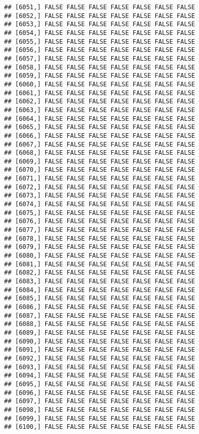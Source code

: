 \documentclass[
]{article}
\begin{document}
\begin{verbatim}
## [6051,] FALSE FALSE FALSE FALSE FALSE FALSE FALSE
## [6052,] FALSE FALSE FALSE FALSE FALSE FALSE FALSE
## [6053,] FALSE FALSE FALSE FALSE FALSE FALSE FALSE
## [6054,] FALSE FALSE FALSE FALSE FALSE FALSE FALSE
## [6055,] FALSE FALSE FALSE FALSE FALSE FALSE FALSE
## [6056,] FALSE FALSE FALSE FALSE FALSE FALSE FALSE
## [6057,] FALSE FALSE FALSE FALSE FALSE FALSE FALSE
## [6058,] FALSE FALSE FALSE FALSE FALSE FALSE FALSE
## [6059,] FALSE FALSE FALSE FALSE FALSE FALSE FALSE
## [6060,] FALSE FALSE FALSE FALSE FALSE FALSE FALSE
## [6061,] FALSE FALSE FALSE FALSE FALSE FALSE FALSE
## [6062,] FALSE FALSE FALSE FALSE FALSE FALSE FALSE
## [6063,] FALSE FALSE FALSE FALSE FALSE FALSE FALSE
## [6064,] FALSE FALSE FALSE FALSE FALSE FALSE FALSE
## [6065,] FALSE FALSE FALSE FALSE FALSE FALSE FALSE
## [6066,] FALSE FALSE FALSE FALSE FALSE FALSE FALSE
## [6067,] FALSE FALSE FALSE FALSE FALSE FALSE FALSE
## [6068,] FALSE FALSE FALSE FALSE FALSE FALSE FALSE
## [6069,] FALSE FALSE FALSE FALSE FALSE FALSE FALSE
## [6070,] FALSE FALSE FALSE FALSE FALSE FALSE FALSE
## [6071,] FALSE FALSE FALSE FALSE FALSE FALSE FALSE
## [6072,] FALSE FALSE FALSE FALSE FALSE FALSE FALSE
## [6073,] FALSE FALSE FALSE FALSE FALSE FALSE FALSE
## [6074,] FALSE FALSE FALSE FALSE FALSE FALSE FALSE
## [6075,] FALSE FALSE FALSE FALSE FALSE FALSE FALSE
## [6076,] FALSE FALSE FALSE FALSE FALSE FALSE FALSE
## [6077,] FALSE FALSE FALSE FALSE FALSE FALSE FALSE
## [6078,] FALSE FALSE FALSE FALSE FALSE FALSE FALSE
## [6079,] FALSE FALSE FALSE FALSE FALSE FALSE FALSE
## [6080,] FALSE FALSE FALSE FALSE FALSE FALSE FALSE
## [6081,] FALSE FALSE FALSE FALSE FALSE FALSE FALSE
## [6082,] FALSE FALSE FALSE FALSE FALSE FALSE FALSE
## [6083,] FALSE FALSE FALSE FALSE FALSE FALSE FALSE
## [6084,] FALSE FALSE FALSE FALSE FALSE FALSE FALSE
## [6085,] FALSE FALSE FALSE FALSE FALSE FALSE FALSE
## [6086,] FALSE FALSE FALSE FALSE FALSE FALSE FALSE
## [6087,] FALSE FALSE FALSE FALSE FALSE FALSE FALSE
## [6088,] FALSE FALSE FALSE FALSE FALSE FALSE FALSE
## [6089,] FALSE FALSE FALSE FALSE FALSE FALSE FALSE
## [6090,] FALSE FALSE FALSE FALSE FALSE FALSE FALSE
## [6091,] FALSE FALSE FALSE FALSE FALSE FALSE FALSE
## [6092,] FALSE FALSE FALSE FALSE FALSE FALSE FALSE
## [6093,] FALSE FALSE FALSE FALSE FALSE FALSE FALSE
## [6094,] FALSE FALSE FALSE FALSE FALSE FALSE FALSE
## [6095,] FALSE FALSE FALSE FALSE FALSE FALSE FALSE
## [6096,] FALSE FALSE FALSE FALSE FALSE FALSE FALSE
## [6097,] FALSE FALSE FALSE FALSE FALSE FALSE FALSE
## [6098,] FALSE FALSE FALSE FALSE FALSE FALSE FALSE
## [6099,] FALSE FALSE FALSE FALSE FALSE FALSE FALSE
## [6100,] FALSE FALSE FALSE FALSE FALSE FALSE FALSE

\end{verbatim}
\end{document}
